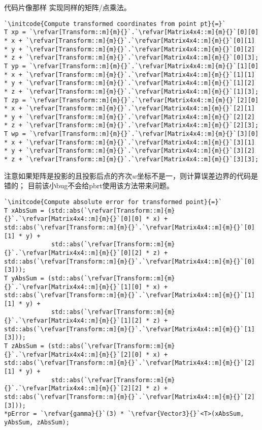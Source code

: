 代码片像那样
实现同样的矩阵/点乘法。
\begin{lstlisting}
`\initcode{Compute transformed coordinates from point pt}{=}`
T xp = `\refvar[Transform::m]{m}{}`.`\refvar[Matrix4x4::m]{m}{}`[0][0] * x + `\refvar[Transform::m]{m}{}`.`\refvar[Matrix4x4::m]{m}{}`[0][1] * y + `\refvar[Transform::m]{m}{}`.`\refvar[Matrix4x4::m]{m}{}`[0][2] * z + `\refvar[Transform::m]{m}{}`.`\refvar[Matrix4x4::m]{m}{}`[0][3];
T yp = `\refvar[Transform::m]{m}{}`.`\refvar[Matrix4x4::m]{m}{}`[1][0] * x + `\refvar[Transform::m]{m}{}`.`\refvar[Matrix4x4::m]{m}{}`[1][1] * y + `\refvar[Transform::m]{m}{}`.`\refvar[Matrix4x4::m]{m}{}`[1][2] * z + `\refvar[Transform::m]{m}{}`.`\refvar[Matrix4x4::m]{m}{}`[1][3];
T zp = `\refvar[Transform::m]{m}{}`.`\refvar[Matrix4x4::m]{m}{}`[2][0] * x + `\refvar[Transform::m]{m}{}`.`\refvar[Matrix4x4::m]{m}{}`[2][1] * y + `\refvar[Transform::m]{m}{}`.`\refvar[Matrix4x4::m]{m}{}`[2][2] * z + `\refvar[Transform::m]{m}{}`.`\refvar[Matrix4x4::m]{m}{}`[2][3];
T wp = `\refvar[Transform::m]{m}{}`.`\refvar[Matrix4x4::m]{m}{}`[3][0] * x + `\refvar[Transform::m]{m}{}`.`\refvar[Matrix4x4::m]{m}{}`[3][1] * y + `\refvar[Transform::m]{m}{}`.`\refvar[Matrix4x4::m]{m}{}`[3][2] * z + `\refvar[Transform::m]{m}{}`.`\refvar[Matrix4x4::m]{m}{}`[3][3];
\end{lstlisting}

注意如果矩阵是投影的且投影后点的齐次$w$坐标不是一，则计算误差边界的代码是错的；
目前该小bug不会给pbrt使用该方法带来问题。
\begin{lstlisting}
`\initcode{Compute absolute error for transformed point}{=}`
T xAbsSum = (std::abs(`\refvar[Transform::m]{m}{}`.`\refvar[Matrix4x4::m]{m}{}`[0][0] * x) + std::abs(`\refvar[Transform::m]{m}{}`.`\refvar[Matrix4x4::m]{m}{}`[0][1] * y) +
             std::abs(`\refvar[Transform::m]{m}{}`.`\refvar[Matrix4x4::m]{m}{}`[0][2] * z) + std::abs(`\refvar[Transform::m]{m}{}`.`\refvar[Matrix4x4::m]{m}{}`[0][3]));
T yAbsSum = (std::abs(`\refvar[Transform::m]{m}{}`.`\refvar[Matrix4x4::m]{m}{}`[1][0] * x) + std::abs(`\refvar[Transform::m]{m}{}`.`\refvar[Matrix4x4::m]{m}{}`[1][1] * y) +
             std::abs(`\refvar[Transform::m]{m}{}`.`\refvar[Matrix4x4::m]{m}{}`[1][2] * z) + std::abs(`\refvar[Transform::m]{m}{}`.`\refvar[Matrix4x4::m]{m}{}`[1][3]));
T zAbsSum = (std::abs(`\refvar[Transform::m]{m}{}`.`\refvar[Matrix4x4::m]{m}{}`[2][0] * x) + std::abs(`\refvar[Transform::m]{m}{}`.`\refvar[Matrix4x4::m]{m}{}`[2][1] * y) +
             std::abs(`\refvar[Transform::m]{m}{}`.`\refvar[Matrix4x4::m]{m}{}`[2][2] * z) + std::abs(`\refvar[Transform::m]{m}{}`.`\refvar[Matrix4x4::m]{m}{}`[2][3]));
*pError = `\refvar{gamma}{}`(3) * `\refvar{Vector3}{}`<T>(xAbsSum, yAbsSum, zAbsSum);
\end{lstlisting}

